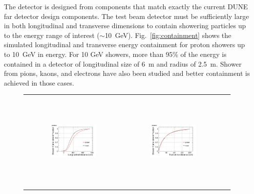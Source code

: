 
The detector is designed from components that match exactly the current DUNE far detector design components. 
The test beam detector must be sufficiently large in both
longitudinal and transverse dimensions to contain showering particles up to the energy range of interest ($\sim$10~GeV).
Fig.~\ref{fig:containment} shows the simulated longitudinal and transverse 
energy containment for proton showers up to 10~GeV in energy.
For 10 GeV showers, more than 95\% of the energy is contained in a detector of longitudinal size of 6~m and 
radius of 2.5~m. Shower from pions, kaons, and electrons have also been studied and better containment
is achieved in those cases. 
\begin{figure}[htp]
  \centering
  \begin{tabular}{ccc}
%  
   \includegraphics[width=0.49\textwidth,height=4.9cm]{figures/protons_lcont_overlay}&
   \includegraphics[width=0.49\textwidth,height=4.9cm]{figures/protons_wcont_overlay}\\
% 
 

\end{tabular}
\end{figure}
